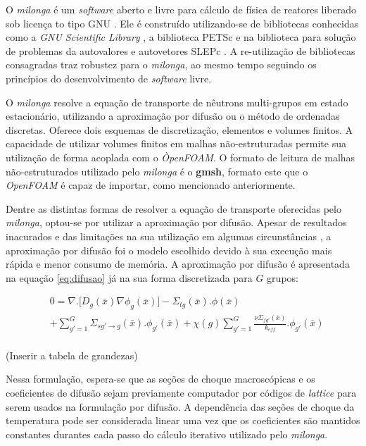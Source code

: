 O \textit{milonga} é um \textit{software} aberto e livre para cálculo de física de reatores
liberado sob licença to tipo GNU \cite{gplv3}. Ele é construído utilizando-se de bibliotecas
conhecidas como a \textit{GNU Scientific Library} \cite{Galassi2009}, a biblioteca
PETSc \cite{Balay2016} e na biblioteca para solução de problemas da autovalores e autovetores
SLEPc \cite{Hernandez2005}. A re-utilização de bibliotecas consagradas traz robustez para
o \textit{milonga}, ao mesmo tempo seguindo os princípios do desenvolvimento de \textit{software} livre.

O \textit{milonga} resolve a equação de transporte de nêutrons multi-grupos em estado estacionário,
utilizando a aproximação por difusão ou o método de ordenadas discretas. Oferece dois esquemas
de discretização, elementos e volumes finitos. A capacidade de utilizar volumes finitos em malhas
não-estruturadas permite sua utilização de forma acoplada com o \textit{ÒpenFOAM}. O formato
de leitura de malhas não-estruturados utilizado pelo \textit{milonga} é o \textbf{gmsh}, formato
este que o \textit{OpenFOAM} é capaz de importar, como mencionado anteriormente.

Dentre as distintas formas de resolver a equação de transporte oferecidas pelo \textit{milonga},
optou-se por utilizar a aproximação por difusão. Apesar de resultados inacurados e das limitações
na sua utilização em algumas circunstâncias \cite{Trahan2014}, a aproximação por difusão
foi o modelo escolhido devido à sua execução mais rápida e menor consumo de memória.
A aproximação por difusão é apresentada na equação \ref{eq:difusao} já na sua forma discretizada
para $G$ grupos:

\begin{equation}
  \label{eq:difusao}
  \begin{split}
  & 0 = \nabla . \big[D_g({\bar{x}}) \nabla \phi_g(\bar{x})\big] 
- \Sigma_{tg}(\bar{x}).\phi(\bar{x}) \\
& + \sum_{g'=1}^{G} \Sigma_{sg'\rightarrow g}(\bar{x}) . \phi_{g'}(\bar{x})
+ \chi(g)  \sum_{g'=1}^{G} \frac{\nu \Sigma_{fg'}(\bar{x})}{k_{eff}} . \phi_{g'}(\bar{x}) \\
  \end{split}
  \end{equation}

(Inserir a tabela de grandezas)

Nessa formulação, espera-se que as seções de choque macroscópicas e os coeficientes de difusão sejam
previamente computador por códigos de \textit{lattice} para serem usados na formulação por difusão.
A dependência das seções de choque da temperatura pode ser considerada linear uma vez que
os coeficientes são mantidos constantes durantes cada passo do cálculo iterativo utilizado
pelo \textit{milonga}.

